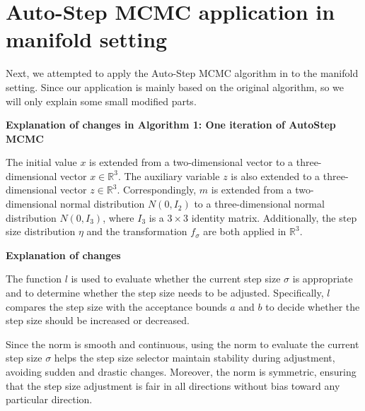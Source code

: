 \documentclass{article}
\begin{document}


\section{Auto-Step MCMC application in manifold setting}
Next, we attempted to apply the Auto-Step MCMC algorithm in \cite{autostep} to the manifold setting. Since our application is mainly based on the original algorithm, so we will only explain some small modified parts.

\textbf{Explanation of changes in Algorithm 1: One iteration of AutoStep MCMC}

The initial value $x$ is extended from a two-dimensional vector to a three-dimensional vector $x \in \mathbb{R}^3$. The auxiliary variable $z$ is also extended to a three-dimensional vector $z \in \mathbb{R}^3$. Correspondingly, $m$ is extended from a two-dimensional normal distribution $N(0, I_2)$ to a three-dimensional normal distribution $N(0, I_3)$, where $I_3$ is a $3 \times 3$ identity matrix. Additionally, the step size distribution $\eta$ and the transformation $f_\sigma$ are both applied in $\mathbb{R}^3$.




\textbf{Explanation of changes}


The function $l$ is used to evaluate whether the current step size $\sigma$ is appropriate and to determine whether the step size needs to be adjusted. Specifically, $l$ compares the step size with the acceptance bounds $a$ and $b$ to decide whether the step size should be increased or decreased.

Since the norm is smooth and continuous, using the norm to evaluate the current step size $\sigma$ helps the step size selector maintain stability during adjustment, avoiding sudden and drastic changes. Moreover, the norm is symmetric, ensuring that the step size adjustment is fair in all directions without bias toward any particular direction.
\end{document}
